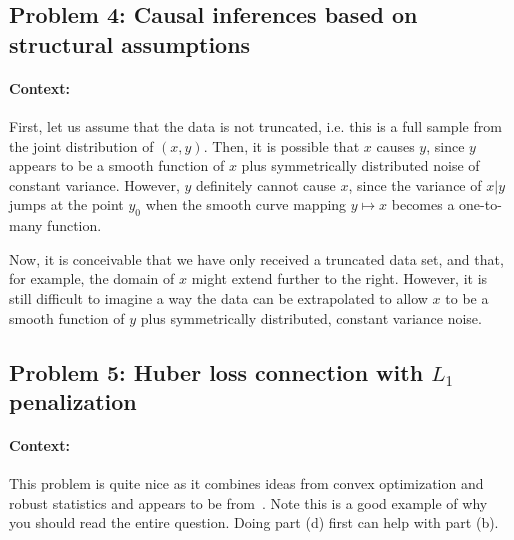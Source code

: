 \subsection*{Problem 4: Causal inferences based on structural assumptions}
\paragraph{Context:} \citet*{mooij2016distinguishing}

First, let us assume that the data is not truncated, i.e. this is a full sample from the joint distribution of $(x, y)$. Then, it is possible that $x$ causes $y$, since $y$ appears to be a smooth function of $x$ plus symmetrically distributed noise of constant variance. However, $y$ definitely cannot cause $x$, since the variance of $x|y$ jumps at the point $y_0$ when the smooth curve mapping $y \mapsto x$ becomes a one-to-many function. 

Now, it is conceivable that we have only received a truncated data set, and that, for example, the domain of $x$ might extend further to the right. However, it is still difficult to imagine a way the data can be extrapolated to allow $x$ to be a smooth function of $y$ plus symmetrically distributed, constant variance noise.

\subsection*{Problem 5: Huber loss connection with $L_1$ penalization}


\paragraph{Context:} This problem is quite nice as it combines ideas from convex optimization and robust statistics and appears to be from~\citet{she2011outlier}. Note this is a good example of why you should read the entire question. Doing part (d) first can help with part (b).


